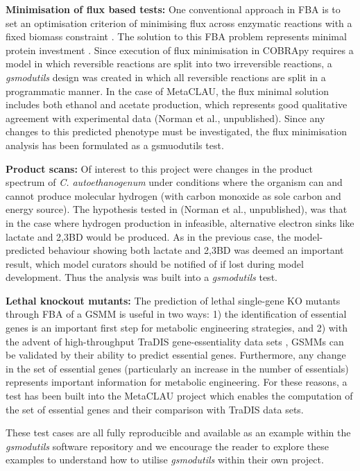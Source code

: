 \documentclass[journal=asbcd6,10pt]{achemso}
\begin{document}
\textbf{Minimisation of flux based tests:}
One conventional approach in FBA is to set an optimisation criterion of minimising flux across enzymatic reactions with a fixed biomass constraint \cite{holzhutter2006thegeneralised}. 
The solution to this FBA problem represents minimal protein investment \cite{holzhutter2006thegeneralised}.
Since execution of flux minimisation in COBRApy requires a model in which reversible reactions are split into two irreversible reactions, a \textit{gsmodutils} design was created in which all reversible reactions are split in a programmatic manner.
In the case of MetaCLAU, the flux minimal solution includes both ethanol and acetate production, which represents good qualitative agreement with experimental data (Norman et al., unpublished).
Since any changes to this predicted phenotype must be investigated, the flux minimisation analysis has been formulated as a gsmuodutils test.

\textbf{Product scans:}
Of interest to this project were changes in the product spectrum of \textit{C. autoethanogenum} under conditions where the organism can and cannot produce molecular hydrogen (with carbon monoxide as sole carbon and energy source).
The hypothesis tested in (Norman et al., unpublished), was that in the case where hydrogen production in infeasible, alternative electron sinks like lactate and 2,3BD would be produced.
As in the previous case, the model-predicted behaviour showing both lactate and 2,3BD was deemed an important result, which model curators should be notified of if lost during model development.
Thus the analysis was built into a \textit{gsmodutils} test.

\textbf{Lethal knockout mutants:} 
The prediction of lethal single-gene KO mutants through FBA of a GSMM is useful in two ways: 
1) the identification of essential genes is an important first step for metabolic engineering strategies, 
and 2) with the advent of high-throughput TraDIS gene-essentiality data sets \cite{langridge2009simultaneous}, GSMMs can be validated by their ability to predict essential genes.
Furthermore, any change in the set of essential genes (particularly an increase in the number of essentials) represents important information for metabolic engineering.
For these reasons, a test has been built into the MetaCLAU project which enables the computation of the set of essential genes and their comparison with TraDIS data sets.

These test cases are all fully reproducible and available as an example within the \textit{gsmodutils} software repository and we encourage the reader to explore these examples to understand how to utilise \textit{gsmodutils} within their own project.
\end{document}
